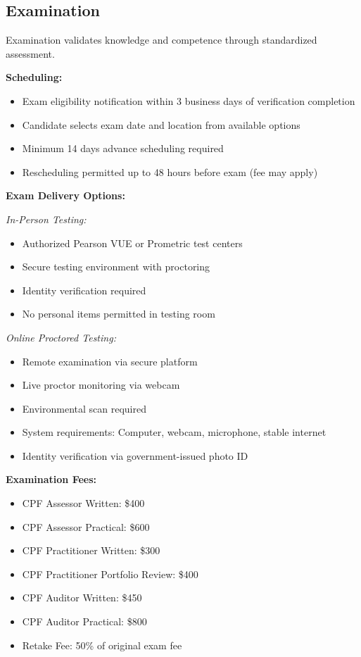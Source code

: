 \documentclass[11pt,a4paper]{article}
\begin{document}
\subsection{Examination}

Examination validates knowledge and competence through standardized assessment.

\textbf{Scheduling:}
\begin{itemize}
\item Exam eligibility notification within 3 business days of verification completion
\item Candidate selects exam date and location from available options
\item Minimum 14 days advance scheduling required
\item Rescheduling permitted up to 48 hours before exam (fee may apply)
\end{itemize}

\textbf{Exam Delivery Options:}

\textit{In-Person Testing:}
\begin{itemize}
\item Authorized Pearson VUE or Prometric test centers
\item Secure testing environment with proctoring
\item Identity verification required
\item No personal items permitted in testing room
\end{itemize}

\textit{Online Proctored Testing:}
\begin{itemize}
\item Remote examination via secure platform
\item Live proctor monitoring via webcam
\item Environmental scan required
\item System requirements: Computer, webcam, microphone, stable internet
\item Identity verification via government-issued photo ID
\end{itemize}

\textbf{Examination Fees:}
\begin{itemize}
\item CPF Assessor Written: \$400
\item CPF Assessor Practical: \$600
\item CPF Practitioner Written: \$300
\item CPF Practitioner Portfolio Review: \$400
\item CPF Auditor Written: \$450
\item CPF Auditor Practical: \$800
\item Retake Fee: 50\% of original exam fee
\end{itemize}
\end{document}
